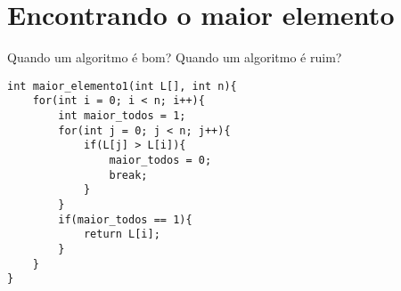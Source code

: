 \documentclass[a4paper,11pt]{article}
\begin{document}








\section*{Encontrando o maior elemento}

Quando um algoritmo é bom? Quando um algoritmo é ruim?

\begin{verbatim}
int maior_elemento1(int L[], int n){
    for(int i = 0; i < n; i++){
        int maior_todos = 1;
        for(int j = 0; j < n; j++){
            if(L[j] > L[i]){
                maior_todos = 0;
                break;
            }
        }
        if(maior_todos == 1){
            return L[i];
        }
    }
}
\end{verbatim}
\end{document}
